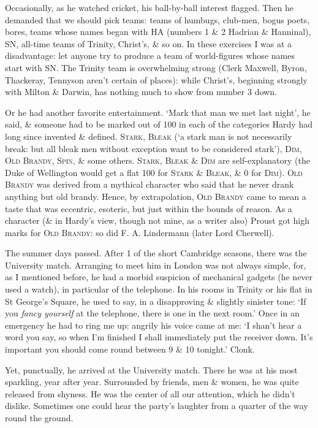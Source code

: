 \documentclass{article}
\numberwithin{equation}{section}
\begin{document}
Occasionally, as he watched cricket, his ball-by-ball interest flagged. Then he demanded that we should pick teams: teams of humbugs, club-men, bogus poets, bores, teams whose names began with HA (numbers 1 \& 2 Hadrian \& Hanninal), SN, all-time teams of Trinity, Christ's, \& so on. In these exercises I was at a disadvantage: let anyone try to produce a team of world-figures whose names start with SN. The Trinity team is overwhelming strong (Clerk Maxwell, Byron, Thackeray, Tennyson aren't certain of places): while Christ's, beginning strongly with Milton \& Darwin, has nothing much to show from number 3 down.

Or he had another favorite entertainment. `Mark that man we met last night', he said, \& someone had to be marked out of 100 in each of the categories Hardy had long since invented \& defined. \textsc{Stark, Bleak} (`a stark man is not necessarily break: but all bleak men without exception want to be considered stark'), \textsc{Dim, Old Brandy, Spin}, \& some others. \textsc{Stark, Bleak} \& \textsc{Dim} are self-explanatory (the Duke of Wellington would get a flat 100 for \textsc{Stark} \& \textsc{Bleak}, \& 0 for \textsc{Dim}). \textsc{Old Brandy} was derived from a mythical character who said that he never drank anything but old brandy. Hence, by extrapolation, \textsc{Old Brandy} came to mean a taste that was eccentric, esoteric, but just within the bounds of reason. As a character (\& in Hardy's view, though not mine, as a writer also) Proust got high marks for \textsc{Old Brandy}: so did F. A. Lindermann (later Lord Cherwell).

The summer days passed. After 1 of the short Cambridge seasons, there was the University match. Arranging to meet him in London was not always simple, for, as I mentioned before, he had a morbid suspicion of mechanical gadgets (he never used a watch), in particular of the telephone. In his rooms in Trinity or his flat in St George's Square, he used to say, in a disapproving \& slightly sinister tone: `If you \textit{fancy yourself} at the telephone, there is one in the next room.' Once in an emergency he had to ring me up: angrily his voice came at me: `I shan't hear a word you say, so when I'm finished I shall immediately put the receiver down. It's important you should come round between 9 \& 10 tonight.' Clonk.

Yet, punctually, he arrived at the University match. There he was at his most sparkling, year after year. Surrounded by friends, men \& women, he was quite released from shyness. He was the center of all our attention, which he didn't dislike. Sometimes one could hear the party's laughter from a quarter of the way round the ground.
\end{document}
